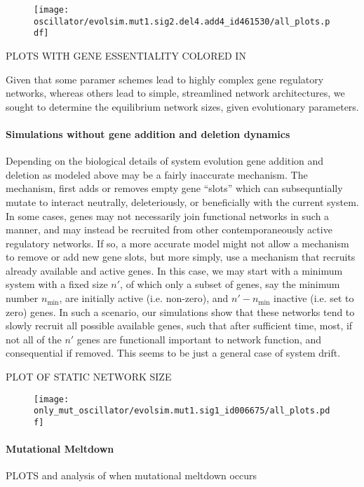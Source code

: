 \documentclass{article}
\newcommand{\1}{\mathbbm{1}}
\begin{document}
\begin{figure}[H]
\texttt{[image: oscillator/evolsim.mut1.sig2.del4.add4\_id461530/all\_plots.pdf]}
\end{figure}
PLOTS WITH GENE ESSENTIALITY COLORED IN

Given that some paramer schemes lead to highly complex gene regulatory networks, whereas others lead to simple, streamlined network architectures,
we sought to determine the equilibrium network sizes, given evolutionary parameters. 

\paragraph{Simulations without gene addition and deletion dynamics}

Depending on the biological details of system evolution gene addition and deletion as modeled above
may be a fairly inaccurate mechanism. The mechanism, first adds or removes empty gene ``slots'' which can
subsequntially mutate to interact neutrally, deleteriously, or beneficially with the current system.
In some cases, genes may not necessarily join functional networks in such a manner, and may instead
be recruited from other contemporaneously active regulatory networks. If so, a more accurate model
might not allow a mechanism to remove or add new gene slots, but more simply, use a mechanism that recruits
already available and active genes. In this case, we may start with a minimum system with a fixed size $n'$,
of which only a subset of genes, say the minimum number $n_{\min}$, are initially active (i.e. non-zero), and
$n' - n_{\min}$ inactive (i.e. set to zero) genes. In such a scenario, our simulations show that these networks
tend to slowly recruit all possible available genes, such that after sufficient time, most, if not all of the $n'$
genes are functionall important to network function, and consequential if removed. This seems to be just a general case
of system drift. 

PLOT OF STATIC NETWORK SIZE
\begin{figure}[H]
\texttt{[image: only\_mut\_oscillator/evolsim.mut1.sig1\_id006675/all\_plots.pdf]}
\end{figure}
\paragraph{Mutational Meltdown}

PLOTS and analysis of when mutational meltdown occurs
\end{document}
